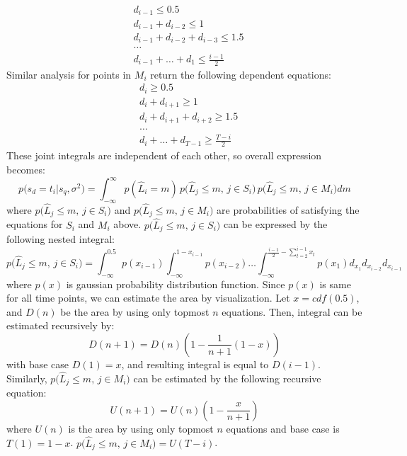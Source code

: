 \documentclass{article}
\begin{document}
%
\begin{align}
& d_{i-1} \le 0.5 \\
& d_{i-1} + d_{i-2} \le 1 \\
& d_{i-1} + d_{i-2} + d_{i-3} \le 1.5 \\
& \ldots \\
& d_{i-1} + \ldots + d_{1} \le \frac{i-1}{2} 
\end{align}
%
Similar analysis for points in $M_{i}$ return the following dependent equations:
%
\begin{align}
& d_{i} \ge 0.5 \\
& d_{i} + d_{i+1} \ge 1 \\
& d_{i} + d_{i+1} + d_{i+2} \ge 1.5 \\
& \ldots \\
& d_{i} + \ldots + d_{T-1} \ge \frac{T-i}{2} 
\end{align}
%
These joint integrals are independent of each other, so overall
expression becomes:
%
\begin{equation}\label{eq:pgenall}
p\big(s_{d} = t_{i} | s_{q}, \sigma^{2} \big) =
\int_{-\infty}^{\infty} p(\hat{L}_{i} = m) \, p\big(\hat{L}_{j} \le m,
\,j \in S_{i}\big)\,p\big(\hat{L}_{j} \le m, \,j \in M_i \big) dm
\end{equation}
%
where $p\big(\hat{L}_{j} \le m, \,j \in S_{i}\big)$ and
$p\big(\hat{L}_{j} \le m, \,j \in M_i \big)$ are probabilities of
satisfying the equations for $S_{i}$ and $M_{i}$
above. $p\big(\hat{L}_{j} \le m, \,j \in S_{i}\big)$ can be expressed
by the following nested integral:
%
\begin{equation}\label{eq:nested}
p\big(\hat{L}_{j} \le m, \,j \in S_{i}\big) = \int_{-\infty}^{0.5}
p(x_{i-1}) \int_{-\infty}^{1-x_{i-1}} p(x_{i-2}) \ldots
\int_{-\infty}^{\frac{i-1}{2}-\sum_{t=2}^{i-1}x_{t}} p(x_{1})
d_{x_{1}} d_{x_{i-2}} d_{x_{i-1}}
\end{equation}
%
where $p(x)$ is gaussian probability distribution function. Since
$p(x)$ is same for all time points, we can estimate the area by
visualization. Let $x=cdf(0.5)$, and $D(n)$ be the area by using only
topmost $n$ equations. Then, integral can be estimated recursively by:
%
\begin{equation}\label{eq:recur}
D(n+1) = D(n) (1 - \frac{1}{n+1}(1-x))
\end{equation}
%
with base case $D(1) = x$, and resulting integral is equal to
$D(i-1)$. Similarly, $p\big(\hat{L}_{j} \le m, \,j \in M_{i}\big)$ can
be estimated by the following recursive equation:
%
\begin{equation}\label{eq:recur}
U(n+1) = U(n) (1 - \frac{x}{n+1})
\end{equation}
%
where $U(n)$ is the area by using only topmost $n$ equations and base
case is $T(1) = 1-x$. $p\big(\hat{L}_{j} \le m, \,j \in M_{i}\big) =
U(T-i)$. 
\end{document}
